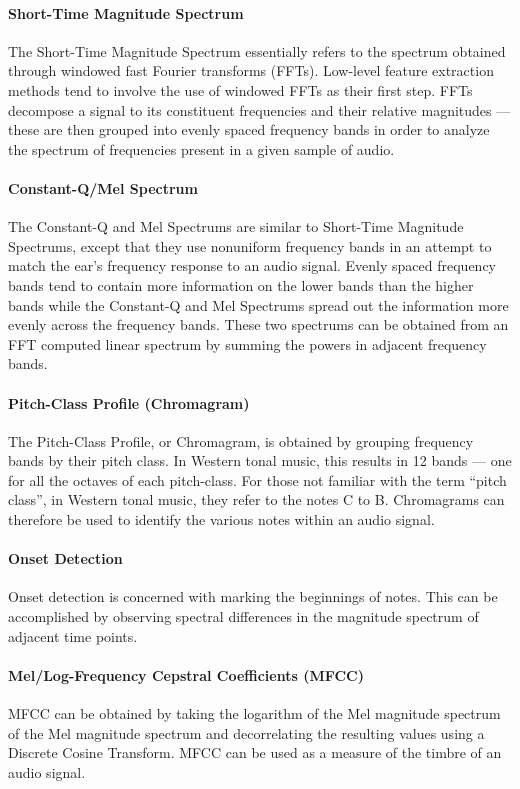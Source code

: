 \documentclass[../initial_thesis.tex]{subfiles}
\begin{document}
\paragraph{Short-Time Magnitude Spectrum}
The Short-Time Magnitude Spectrum essentially refers to the spectrum obtained through windowed fast Fourier transforms (FFTs). Low-level feature extraction methods tend to involve the use of windowed FFTs as their first step. FFTs decompose a signal to its constituent frequencies and their relative magnitudes --- these are then grouped into evenly spaced frequency bands in order to analyze the spectrum of frequencies present in a given sample of audio.

\paragraph{Constant-Q/Mel Spectrum}
The Constant-Q and Mel Spectrums are similar to Short-Time Magnitude Spectrums, except that they use nonuniform frequency bands in an attempt to match the ear's frequency response to an audio signal. Evenly spaced frequency bands tend to contain more information on the lower bands than the higher bands while the Constant-Q and Mel Spectrums spread out the information more evenly across the frequency bands. These two spectrums can be obtained from an FFT computed linear spectrum by summing the powers in adjacent frequency bands.

\paragraph{Pitch-Class Profile (Chromagram)}
The Pitch-Class Profile, or Chromagram, is obtained by grouping frequency bands by their pitch class. In Western tonal music, this results in 12 bands --- one for all the octaves of each pitch-class. For those not familiar with the term ``pitch class'', in Western tonal music, they refer to the notes C to B. Chromagrams can therefore be used to identify the various notes within an audio signal.

\paragraph{Onset Detection}
Onset detection is concerned with marking the beginnings of notes. This can be accomplished by observing spectral differences in the magnitude spectrum of adjacent time points.

\paragraph{Mel/Log-Frequency Cepstral Coefficients (MFCC)}
MFCC can be obtained by taking the logarithm of the Mel magnitude spectrum of the Mel magnitude spectrum and decorrelating the resulting values using a Discrete Cosine Transform. MFCC can be used as a measure of the timbre of an audio signal.
\end{document}
